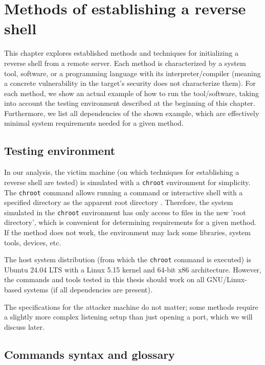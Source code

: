\newcommand{\commandpath}[1]{chapters/chapter2/commands/#1}

\chapter{Methods of establishing a reverse shell}

\label{chap:methods}

This chapter explores established methods and techniques for initializing a reverse shell from a remote server. Each method is characterized by a system tool, software, or a programming language with its interpreter/compiler (meaning a concrete vulnerability in the target's security does not characterize them). For each method, we show an actual example of how to run the tool/software, taking into account the testing environment described at the beginning of this chapter. Furthermore, we list all dependencies of the shown example, which are effectively minimal system requirements needed for a given method.

\section{Testing environment}

In our analysis, the victim machine (on which techniques for establishing a reverse shell are tested) is simulated with a \texttt{chroot} environment for simplicity. The \texttt{chroot} command allows running a command or interactive shell with a specified directory as the apparent root directory \cite{chroot-man}. Therefore, the system simulated in the \texttt{chroot} environment has only access to files in the new 'root directory', which is convenient for determining requirements for a given method. If the method does not work, the environment may lack some libraries, system tools, devices, etc.

The host system distribution (from which the \texttt{chroot} command is executed) is Ubuntu 24.04 LTS with a Linux 5.15 kernel and 64-bit x86 architecture. However, the commands and tools tested in this thesis should work on all GNU/Linux-based systems (if all dependencies are present).

The specifications for the attacker machine do not matter; some methods require a slightly more complex listening setup than just opening a port, which we will discuss later.

\section{Commands syntax and glossary}

